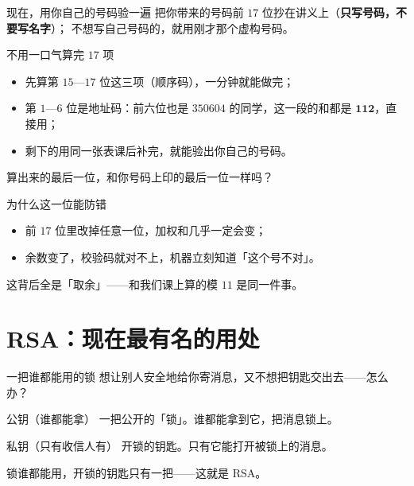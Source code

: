 \documentclass[10pt]{beamer}
\begin{document}
\begin{frame}{现在，用你自己的号码验一遍}
  把你带来的号码前 \(17\) 位抄在讲义上（\textbf{只写号码，不要写名字}）；
  不想写自己号码的，就用刚才那个虚构号码。
  \pause
  \begin{block}{不用一口气算完 \(17\) 项}
    \begin{itemize}
      \item 先算第 \(15\)—\(17\) 位这三项（顺序码），一分钟就能做完；
      \item 第 \(1\)—\(6\) 位是地址码：前六位也是 \(350604\) 的同学，这一段的和都是 \(\mathbf{112}\)，直接用；
      \item 剩下的用同一张表课后补完，就能验出你自己的号码。
    \end{itemize}
  \end{block}
  \pause
  \begin{center}
    {\large 算出来的最后一位，和你号码上印的最后一位一样吗？}
  \end{center}
\end{frame}

\begin{frame}{为什么这一位能防错}
  \begin{itemize}
    \item 前 \(17\) 位里改掉任意一位，加权和几乎一定会变；
    \item 余数变了，校验码就对不上，机器立刻知道「这个号不对」。
  \end{itemize}
  \pause
  \begin{att}
    这背后全是「取余」——和我们课上算的模 \(11\) 是同一件事。
  \end{att}
\end{frame}

\section{RSA：现在最有名的用处}

\begin{frame}{一把谁都能用的锁}
  想让别人安全地给你寄消息，又不想把钥匙交出去——怎么办？
  \begin{block}{公钥（谁都能拿）}
    一把公开的「锁」。谁都能拿到它，把消息锁上。
  \end{block}
  \begin{block}{私钥（只有收信人有）}
    开锁的钥匙。只有它能打开被锁上的消息。
  \end{block}
  \pause
  \begin{center}
    {\large 锁谁都能用，开锁的钥匙只有一把——这就是 RSA。}
  \end{center}
\end{frame}
\end{document}
